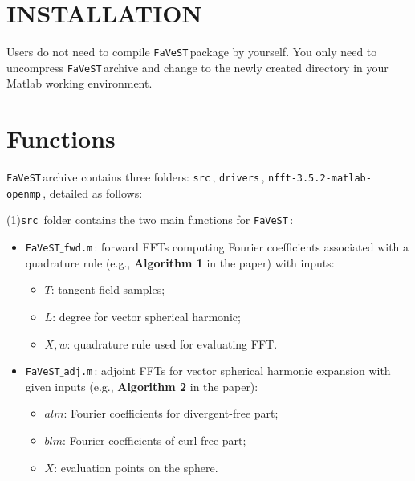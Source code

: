 \documentclass[preprint]{acmart}
\newcommand{\hlgtexttt}[1]{\texttt{\colorbox{lightgray!15}{#1}}}
\newcommand{\favest}{\hlgtexttt{FaVeST}\,}
\newcommand{\code}[1]{\hlgtexttt{#1}\,}
\begin{document}
\maketitle


%
\section{INSTALLATION}
Users do not need to compile \favest package by yourself. You only need to uncompress \favest archive and change to the newly created directory in your Matlab working environment. 

\section{Functions}\label{sec:related_works}
\favest archive contains three folders: \code{src}, \code{drivers}, \code{nfft-3.5.2-matlab-openmp}, detailed as follows:

(1)\code{src} folder contains the two main functions for \favest:
\begin{itemize}
  \item \code{FaVeST$\_$fwd.m}: forward FFTs computing Fourier coefficients associated with a quadrature rule (e.g., \textbf{Algorithm 1} in the paper) with inputs:
  \begin{itemize}
  \item $T$: tangent field samples;
  \item $L$: degree for vector spherical harmonic;
 \item $X,w$: quadrature rule used for evaluating FFT.
  \end{itemize}
            
  \item \code{FaVeST$\_$adj.m}: adjoint FFTs for vector spherical harmonic expansion with given inputs (e.g., \textbf{Algorithm 2} in the paper):
  \begin{itemize}
   \item  $alm$: Fourier coefficients for divergent-free part;
   \item $blm$: Fourier coefficients of curl-free part;
   \item $X$: evaluation points on the sphere.
  \end{itemize}
\end{itemize}
\end{document}
